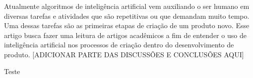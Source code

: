 Atualmente algoritmos de inteligência artificial vem auxiliando o ser humano em diversas tarefas e atividades que são repetitivas ou que demandam muito tempo. Uma dessas tarefas são as primeiras etapas de criação de um produto novo. Esse artigo busca fazer uma leitura de artigos acadêmicos a fim de entender o uso de inteligência artificial nos processos de criação dentro do desenvolvimento de produto. [ADICIONAR PARTE DAS DISCUSSÕES E CONCLUSÕES AQUI]

Teste